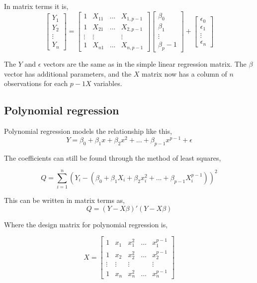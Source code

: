 	In matrix terms it is,  
	$$
	\left[
	\begin{array}{c}
		Y_1 \\ 
		Y_2 \\ 
		\vdots \\
		Y_n 
	\end{array}
	\right]
	=
	\left[
	\begin{array}{cccc}
		1 & X_{11} & ... & X_{1, p-1} \\ 
		1 & X_{21} & ... & X_{2, p-1} \\ 
		\vdots & \vdots &  & \vdots \\
		1 & X_{n1} & ... & X_{n, p-1}
	\end{array}
	\right]
	\left[
	\begin{array}{c}
		\beta_0 \\ 
		\beta_1 \\
		\vdots \\
		\beta_p-1 
	\end{array}
	\right]
	+
	\left[
	\begin{array}{c}
		\epsilon_0 \\ 
		\epsilon_1 \\
		\vdots \\
		\epsilon_n 
	\end{array}
	\right]
	$$
	
	The $Y$ and $\epsilon$ vectors are the same as in the simple linear regression matrix. The $\beta$ vector has additional parameters, and the $X$ matrix now has a column of $n$ observations for each $p-1 X$ variables. \newline 
	
	\subsection{Polynomial regression}
	Polynomial regression models the relationship like this, 
	$$Y=\beta_0 + \beta_1 x + \beta_2 x^2	+ ... + \beta_{p-1} x^{p-1}+ \epsilon$$
	
	The coefficients can still be found through the method of least squares,
	
	$$Q=\sum_{i=1}^{n}(Y_i -(\beta_0 + \beta_1 X_i + \beta_2 x_i^2 + ... + \beta_{p-1}X_{i}^{p-1}))^2$$
	\newline
	
	This can be written in matrix terms as,
	$$Q=(Y-X\beta)' (Y-X\beta)$$
	
	Where the design matrix for polynomial regression is, 
	
	$$ X=
	\left[
	\begin{array}{ccccc}
		1&x_1&x_1^2&...&x_1^{p-1}\\ 
		1&x_2&x_2^2&...&x_2^{p-1} \\
		\vdots & \vdots &\vdots &&\vdots\\
		1&x_n&x_n^2&...&x_n^{p-1} 
	\end{array}
	\right]
	$$
	
